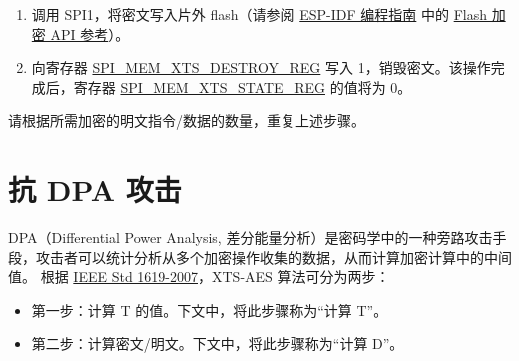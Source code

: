 \documentclass[main\_\_CN.tex]{subfiles}
\begin{document}
\begin{enumerate}
    \item 调用 SPI1，将密文写入片外 flash（请参阅 \href{https://docs.espressif.com/projects/esp-idf/en/latest/esp32p4/index.html}{ESP-IDF 编程指南} 中的 \href{https://docs.espressif.com/projects/esp-idf/en/latest/esp32p4/api-reference/peripherals/spi_flash/index.html#api-reference-flash-encrypt}{Flash 加密 API 参考}）。

    \item 向寄存器 \hyperref[regdesc:SPIMEMXTSDESTROYREG]{SPI\_MEM\_XTS\_DESTROY\_REG} 写入 1，销毁密文。该操作完成后，寄存器 \hyperref[regdesc:SPIMEMXTSSTATEREG]{SPI\_MEM\_XTS\_STATE\_REG} 的值将为 0。

\end{enumerate}

请根据所需加密的明文指令/数据的数量，重复上述步骤。


\section{抗 DPA 攻击}
DPA（Differential Power Analysis, 差分能量分析）是密码学中的一种旁路攻击手段，攻击者可以统计分析从多个加密操作收集的数据，从而计算加密计算中的中间值。
根据 \href{https://ieeexplore.ieee.org/document/4493450}{IEEE Std 1619-2007}，XTS-AES 算法可分为两步：
\begin{itemize}
    \item 第一步：计算 T 的值。下文中，将此步骤称为“计算 T”。
    \item 第二步：计算密文/明文。下文中，将此步骤称为“计算 D”。
\end{itemize}
\end{document}
